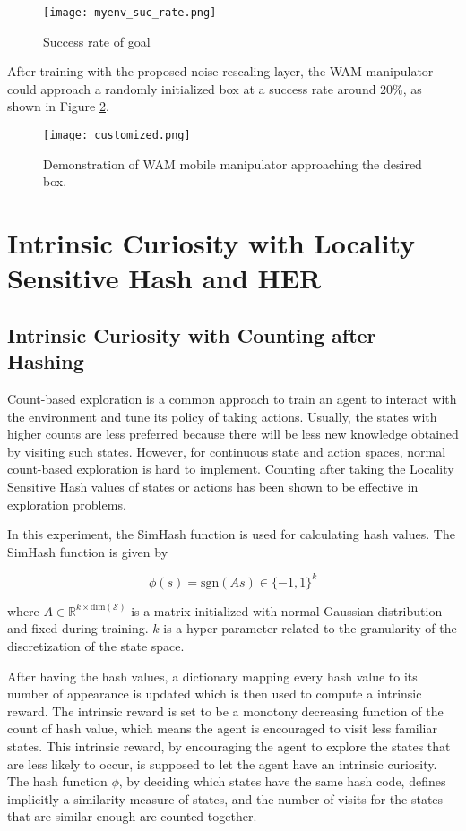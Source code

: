 \documentclass[a4paper, 12pt]{report}
\begin{document}
        \begin{figure}[H]
        \centering
        \texttt{[image: myenv\_suc\_rate.png]}
        \caption{Success rate of goal}
            \label{fcn_suc_rate}
        \end{figure}

    After training with the proposed noise rescaling layer, the WAM manipulator could approach a randomly initialized box at a success rate around 20\%, as shown in Figure \ref{customized}.
    \begin{figure}[H]
    \centering
    \texttt{[image: customized.png]}
    \caption{Demonstration of WAM mobile manipulator approaching the desired box.}
        \label{customized}
    \end{figure}


\chapter {Intrinsic Curiosity with Locality Sensitive Hash and HER}

    \section{Intrinsic Curiosity with Counting after Hashing}
    
    Count-based exploration is a common approach to train an agent to interact with the environment and tune its policy of taking actions. Usually, the states with higher counts are less preferred because there will be less new knowledge obtained by visiting such states. However, for continuous state and action spaces, normal count-based exploration is hard to implement. Counting after taking the Locality Sensitive Hash values of states or actions has been shown to be effective in exploration problems\cite{DBLP:journals/corr/TangHFSCDSTA16}. 

    In this experiment, the SimHash\cite{Charikardept_similarityestimation} function is used for calculating hash values. The SimHash function is given by

    $$\phi(s)=\mathrm{sgn}(As)\in\{-1,1\}^k$$

    where $A\in \mathbb R^{k\times \mathrm{dim}(\mathcal S)}$ is a matrix initialized with normal Gaussian distribution and fixed during training. $k$ is a hyper-parameter related to the granularity of the discretization of the state space.

    After having the hash values, a dictionary mapping every hash value to its number of appearance is updated which is then used to compute a intrinsic reward. The intrinsic reward is set to be a monotony decreasing function of the count of hash value, which means the agent is encouraged to visit less familiar states. This intrinsic reward, by encouraging the agent to explore the states that are less likely to occur, is supposed to let the agent have an intrinsic curiosity. The hash function $\phi$, by deciding which states have the same hash code, defines implicitly a similarity measure of states, and the number of visits for the states that are similar enough are counted together.
\end{document}
